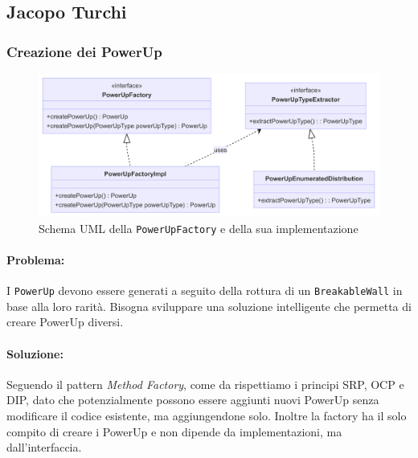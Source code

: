 \documentclass[a4paper,12pt]{report}
\begin{document}
\subsection{Jacopo Turchi}


\subsubsection{Creazione dei PowerUp}
\begin{figure}[H]
\centering{}
\includegraphics[width=1.0\columnwidth]{img/power-up-factory-uml.png}
\caption{Schema UML della \texttt{PowerUpFactory} e della sua implementazione}
\label{img:uml-power-up-factory}
\end{figure}
\paragraph{Problema:} I \texttt{PowerUp} devono essere generati a seguito della rottura di un \texttt{BreakableWall} in base alla loro rarità. Bisogna sviluppare una soluzione intelligente che permetta di creare PowerUp diversi.
\paragraph{Soluzione:} Seguendo il pattern \textit{Method Factory}, come da
 rispettiamo i principi SRP, OCP e DIP, dato che potenzialmente possono essere aggiunti nuovi PowerUp senza modificare il codice esistente, ma aggiungendone solo. Inoltre la factory ha il solo compito di creare i PowerUp e non dipende da implementazioni, ma dall'interfaccia.
\end{document}
